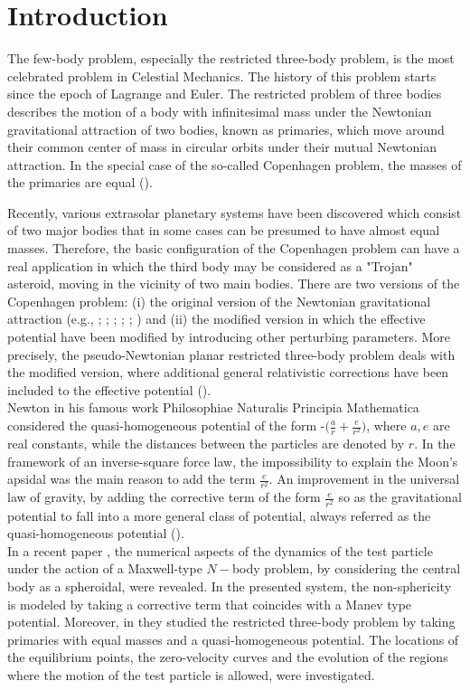 \documentclass[preprint,fleqn,5p,numbers,sort&compress]{elsarticle}
\begin{document}
\section{Introduction}
\label{intro:1}
The few-body problem, especially the restricted three-body problem, is the most celebrated problem in Celestial Mechanics. The history of this problem starts since the epoch of Lagrange and Euler. The restricted problem of three bodies describes the motion of a body with infinitesimal mass under the Newtonian gravitational attraction of two bodies, known as primaries, which move around their common center of mass in circular orbits under their mutual Newtonian attraction. In the special case of the so-called Copenhagen problem, the masses of the primaries are equal (\cite{sze67}).

Recently, various extrasolar planetary systems have been discovered which consist of two major bodies that in some cases can be presumed to have almost equal masses. Therefore, the basic configuration of the Copenhagen problem can have a real application in which the third body may be considered as a "Trojan" asteroid, moving in the vicinity of two main bodies. There are two versions of the Copenhagen problem: (i) the original version of the Newtonian gravitational attraction (e.g., \cite{ben96}; \cite{per96}; \cite{bro01}; \cite{kal08, kal12}; \cite{pap09}; \cite{zot15}) and (ii) the modified version in which the effective potential have been modified by introducing other perturbing parameters. More precisely, the pseudo-Newtonian planar restricted three-body problem deals with the modified version, where additional general relativistic corrections have been included to the effective potential (\cite{zot17a}).\\
Newton in his famous work Philosophiae Naturalis Principia Mathematica considered the quasi-homogeneous potential of the form -$\Big(\frac{a}{r}+\frac{e}{r^2}\Big)$, where $a, e$ are real constants, while the distances between the particles are denoted by $r$. In the framework of an inverse-square force law, the impossibility to explain the Moon's apsidal was the main reason to add the term $\frac{e}{r^2}$. An improvement in the universal law of gravity, by adding the corrective term of the form $\frac{e}{r^2}$ so as the gravitational potential to fall into a more general class of potential, always referred as the quasi-homogeneous potential (\cite{dia96}).\\
In a recent paper \cite{fak13}, the numerical aspects of the dynamics of the test particle under the action of a Maxwell-type $N-$body problem, by considering the central body as a spheroidal, were revealed. In the presented system, the non-sphericity is modeled by taking a corrective term that coincides with a Manev type potential. Moreover, in \cite{fak17} they studied the restricted three-body problem by taking primaries with equal masses and a quasi-homogeneous potential. The locations of the equilibrium points, the zero-velocity curves and the evolution of the regions where the motion of the test particle is allowed, were investigated. \\
\end{document}
